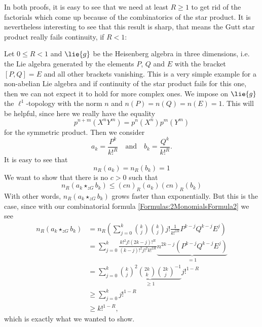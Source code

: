 In both proofs, it is easy to see that we need at least $R \geq 1$ to
get rid of the factorials which come up because of the combinatorics
of the star product. It is nevertheless interesting to see that this
result is sharp, that means the Gutt star product really fails
continuity, if $R < 1$:
\begin{example}
    \label{Ex:LCAna:HeisenbergAlgebra}%
    Let $0 \leq R < 1$ and $\lie{g}$ be the Heisenberg algebra in three 
    dimensions, i.e. the Lie algebra generated by the elements 
    $P$, $Q$ and $E$ with the bracket $[P,Q] = E$ and all other brackets
    vanishing. This is a very simple example for a non-abelian Lie algebra
    and if continuity of the star product fails for this one, then we
    can not expect it to hold for more complex ones. We impose on
    $\lie{g}$ the $\ell^1$-topology with the norm $n$ and $n(P) = n(Q)
    = n(E) = 1$. This will be helpful, since here we really have the equality
    \begin{equation*}
    		p^{n+m} \left( X^n Y^m \right)
    		=
    		p^n \left( X^n \right)
    		p^m \left( Y^m \right)
    \end{equation*}
    for the symmetric product. Then we consider
    \begin{equation*}
        a_k
        =
        \frac{P^k}{k!^R}
        \quad
        \textrm{and}
        \quad
        b_k
        =
        \frac{Q^k}{k!^R}.
    \end{equation*}
    It is easy to see that
    \begin{equation*}
        n_R(a_k)
        =
        n_R(b_k)
        =
        1
    \end{equation*}
    We want to show that there is no $c > 0$ such that
    \begin{equation*}
        n_R(a_k \star_{zG} b_k)
        \leq
        (c n)_R(a_k) (c n)_R(b_k)
    \end{equation*}
    With other words, $n_R(a_k \star_{zG} b_k)$ grows faster than
    exponentially. But this is the case, since with our combinatorial
    formula \eqref{Formulas:2MonomialsFormula2} we see
    \begin{align*}
        n_R(a_k \star_{zG} b_k)
        & =
        n_R \left(
        \sum\limits_{j=0}^k
        \binom{k}{j}
        \binom{k}{j}
        j! \frac{1}{k!^{2R}}
        P^{k-j} Q^{k-j} E^j
        \right)
        \\
        & =
        \sum\limits_{j=0}^k
        \frac{k!^2 j! (2k - j)!^R}{(k-j)!^2 j!^2 k!^{2R}}
        \underbrace{
        n^{2k-j}
        ( P^{k-j} Q^{k-j} E^j )
        }_{= 1}
        \\
        & =
        \sum\limits_{j=0}^k
        \underbrace{
        \binom{k}{j}^2 \binom{2k}{k} \binom{2k}{j}^{-1}
        }_{\geq 1}
        j!^{1-R}
        \\
        & \geq
        \sum\limits_{j=0}^k
        j!^{1-R}
        \\
        & \geq
        k!^{1-R},
    \end{align*}
    which is exactly what we wanted to show.
\end{example}



